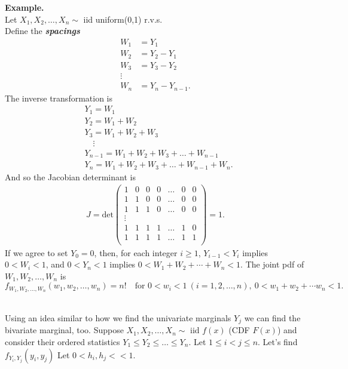 \documentclass[12pt]{article}
\begin{document}
\newpage


\noindent \textbf{Example.} \\
Let $X_1, X_2, \dots, X_n \sim$ iid uniform(0,1) r.v.s.\\
Define the {\bf \em spacings}\label{spacings}
\begin{align*}
    W_1 &= Y_1 \\
    W_2 &= Y_2 - Y_1 \\
    W_3 &= Y_3 - Y_2 \\
    \vdots & \\
    W_n &= Y_n - Y_{n-1}.
\end{align*}
The inverse transformation is
\begin{align*}
    & Y_1 = W_1 \\
    & Y_2 = W_1 + W_2 \\
    & Y_3 = W_1 + W_2 + W_3 \\
    & \quad \vdots \\
    & Y_{n-1} = W_1 + W_2 + W_3 + \dots + W_{n-1} \\
    & Y_n = W_1 + W_2 + W_3 + \dots + W_{n-1} + W_n.
\end{align*}
And so the Jacobian determinant is
\begin{align*}
    J = \text{det}
    \begin{pmatrix}
    1 & 0 & 0 & 0 & \dots & 0 & 0 \\
    1 & 1 & 0 & 0 & \dots & 0 & 0 \\
    1 & 1 & 1 & 0 & \dots & 0 & 0 \\
    \vdots &&&& \\
    1 & 1 & 1 & 1 & \dots & 1 & 0 \\
    1 & 1 & 1 & 1 & \dots & 1 & 1 \\
    \end{pmatrix} = 1.
\end{align*}
If we agree to set $Y_0=0$, then, for each integer $i\ge 1$, $Y_{i-1}<Y_i$ implies $0<W_i<1$, and $0<Y_n<1$ implies $0<W_1+W_2+\cdots + W_n <1$.
The joint pdf of $W_1,W_2,\dots,W_n$ is
$$f_{W_1,W_2,\dots,W_n}(w_1,w_2,\dots,w_n) = n!\quad\mbox{for }0<w_i<1\ (i=1,2,\dots,n),\ 0<w_1+w_2+\cdots w_n<1.$$



\newpage


\label{bivariatemarginalYiYj}\\
Using an idea similar to how we find the univariate marginals $Y_j$ we can find the bivariate marginal, too. Suppose $X_1, X_2, \dots, X_n \sim$ iid $f(x)$ (CDF $F(x)$) and consider their ordered statistics $Y_1 \leq Y_2 \leq \dots \leq Y_n$.
Let $1 \leq i < j \leq n$. Let's find $f_{Y_i, Y_j}(y_i, y_j)$ Let $0 < h_i, h_j << 1$.\\
\end{document}
